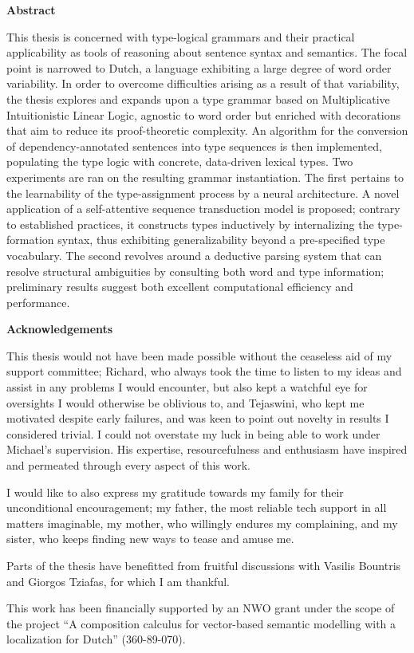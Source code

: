 \documentclass{book}
\newlength{\arrow}
\newenvironment{abstract}%
    {\cleardoublepage\thispagestyle{empty}\null\vfill\begin{center}%
    \bfseries\abstractname\end{center}}%
    {\vfill\null}
\newcommand\abstractname{Abstract}
\newenvironment{acknowledgements}%
    {\cleardoublepage\thispagestyle{empty}\null\vfill\begin{center}%
    \bfseries Acknowledgements\end{center}}%
    {\vfill\null}
\begin{document}
\begin{abstract}
This thesis is concerned with type-logical grammars and their practical applicability as tools of reasoning about sentence syntax and semantics.
The focal point is narrowed to Dutch, a language exhibiting a large degree of word order variability.
In order to overcome difficulties arising as a result of that variability, the thesis explores and expands upon a type grammar based on Multiplicative Intuitionistic Linear Logic, agnostic to word order but enriched with decorations that aim to reduce its proof-theoretic complexity.
An algorithm for the conversion of dependency-annotated sentences into type sequences is then implemented, populating the type logic with concrete, data-driven lexical types.
Two experiments are ran on the resulting grammar instantiation.
The first pertains to the learnability of the type-assignment process by a neural architecture. 
A novel application of a self-attentive sequence transduction model is proposed; contrary to established practices, it constructs types inductively by internalizing the type-formation syntax, thus exhibiting generalizability beyond a pre-specified type vocabulary.
The second revolves around a deductive parsing system that can resolve structural ambiguities by consulting both word and type information; preliminary results suggest both excellent computational efficiency and performance.
\end{abstract}

\begin{acknowledgements}
This thesis would not have been made possible without the ceaseless aid of my support committee;
Richard, who always took the time to listen to my ideas and assist in any problems I would encounter, but also kept a watchful eye for oversights I would otherwise be oblivious to, and
Tejaswini, who kept me motivated despite early failures, and was keen to point out novelty in results I considered trivial.
I could not overstate my luck in being able to work under Michael's supervision.
His expertise, resourcefulness and enthusiasm have inspired and permeated through every aspect of this work.

\vspace{1.6em}
I would like to also express my gratitude towards my family for their unconditional encouragement; my father, the most reliable tech support in all matters imaginable, my mother, who willingly endures my complaining, and my sister, who keeps finding new ways to tease and amuse me.

\vspace{1.6em}
Parts of the thesis have benefitted from fruitful discussions with Vasilis Bountris and Giorgos Tziafas, for which I am thankful.

\vspace{1.6em}
This work has been financially supported by an NWO grant under the scope of the project ``A composition calculus for vector-based semantic modelling with a localization for Dutch'' (360-89-070).
\end{acknowledgements}
\end{document}
